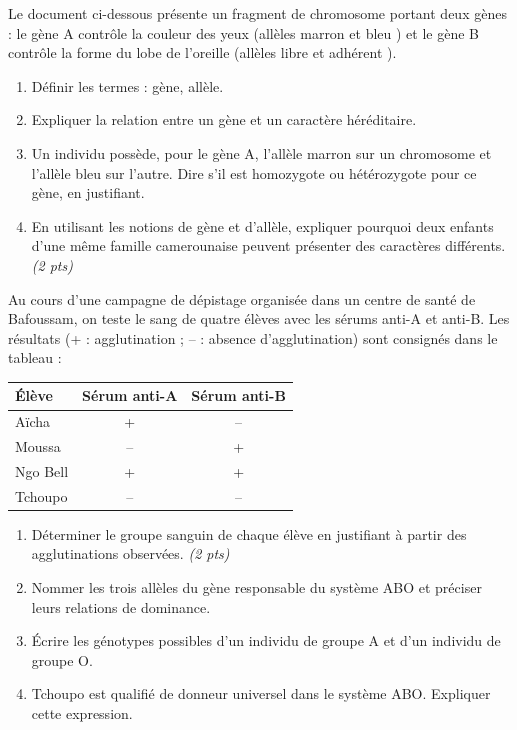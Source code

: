 \documentclass[11pt]{article}
\begin{document}
\begin{exercice}
Le document ci-dessous présente un fragment de chromosome portant deux gènes : le gène A contrôle la couleur des yeux (allèles \og marron \fg{} et \og bleu \fg) et le gène B contrôle la forme du lobe de l'oreille (allèles \og libre \fg{} et \og adhérent \fg).
\begin{enumerate}
\item Définir les termes : gène, allèle.
\item Expliquer la relation entre un gène et un caractère héréditaire.
\item Un individu possède, pour le gène A, l'allèle \og marron \fg{} sur un chromosome et l'allèle \og bleu \fg{} sur l'autre. Dire s'il est homozygote ou hétérozygote pour ce gène, en justifiant.
\item En utilisant les notions de gène et d'allèle, expliquer pourquoi deux enfants d'une même famille camerounaise peuvent présenter des caractères différents. \textit{(2 pts)}
\end{enumerate}
\end{exercice}

\begin{exercice}
Au cours d'une campagne de dépistage organisée dans un centre de santé de Bafoussam, on teste le sang de quatre élèves avec les sérums anti-A et anti-B. Les résultats (+ : agglutination ; -- : absence d'agglutination) sont consignés dans le tableau :

\begin{center}
\begin{tabular}{|l|c|c|}
\hline
\textbf{Élève} & \textbf{Sérum anti-A} & \textbf{Sérum anti-B} \\
\hline
Aïcha & + & -- \\
\hline
Moussa & -- & + \\
\hline
Ngo Bell & + & + \\
\hline
Tchoupo & -- & -- \\
\hline
\end{tabular}
\end{center}

\begin{enumerate}
\item Déterminer le groupe sanguin de chaque élève en justifiant à partir des agglutinations observées. \textit{(2 pts)}
\item Nommer les trois allèles du gène responsable du système ABO et préciser leurs relations de dominance.
\item Écrire les génotypes possibles d'un individu de groupe A et d'un individu de groupe O.
\item Tchoupo est qualifié de \og donneur universel \fg{} dans le système ABO. Expliquer cette expression.
\end{enumerate}
\end{exercice}
\end{document}
